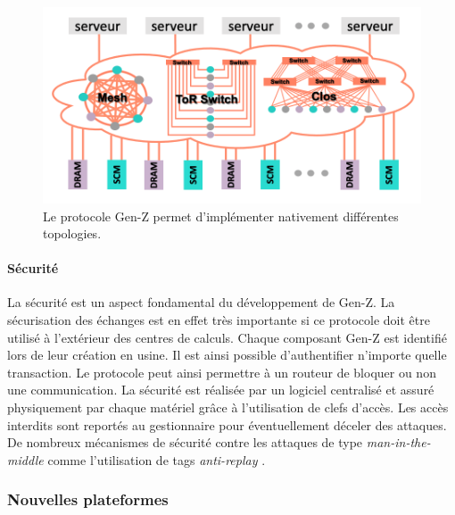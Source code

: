                 \begin{figure}
                \center
                \includegraphics[width=14cm]{images/edl_genz_topo.png}
                \caption{\label{fig:edl_genz_topo} Le protocole Gen-Z permet d'implémenter nativement différentes topologies.}
            \end{figure}
            
            

    \paragraph{Sécurité}

        La sécurité est un aspect fondamental du développement de Gen-Z. La sécurisation des échanges est en effet très importante si ce protocole doit être utilisé à l'extérieur des centres de calculs. Chaque composant Gen-Z est identifié lors de leur création en usine. Il est ainsi possible d'authentifier n'importe quelle transaction. Le protocole peut ainsi permettre à un routeur de bloquer ou non une communication. La sécurité est réalisée par un logiciel centralisé et assuré physiquement par chaque matériel grâce à l’utilisation de clefs d’accès. Les accès interdits sont reportés au gestionnaire pour éventuellement déceler des attaques. De nombreux mécanismes de sécurité contre les attaques de type \textit{man-in-the-middle} comme l'utilisation de tags \textit{anti-replay} \cite{Radhakishan2011}.

    \subsubsection{Nouvelles plateformes} \label{sec:oppo_new_tech} \label{sec:compute_on_the_edge}
            
